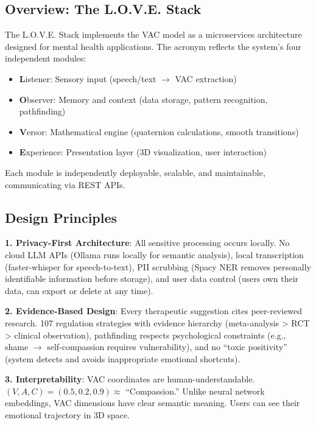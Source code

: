 \documentclass[10pt,twocolumn]{article}
\begin{document}
\subsection{Overview: The L.O.V.E. Stack}

The L.O.V.E. Stack implements the VAC model as a microservices architecture designed for mental health applications. The acronym reflects the system's four independent modules:

\begin{itemize}
    \item \textbf{L}istener: Sensory input (speech/text $\rightarrow$ VAC extraction)
    \item \textbf{O}bserver: Memory and context (data storage, pattern recognition, pathfinding)
    \item \textbf{V}ersor: Mathematical engine (quaternion calculations, smooth transitions)
    \item \textbf{E}xperience: Presentation layer (3D visualization, user interaction)
\end{itemize}

Each module is independently deployable, scalable, and maintainable, communicating via REST APIs.

\subsection{Design Principles}

\textbf{1. Privacy-First Architecture}: All sensitive processing occurs locally. No cloud LLM APIs (Ollama runs locally for semantic analysis), local transcription (faster-whisper for speech-to-text), PII scrubbing (Spacy NER removes personally identifiable information before storage), and user data control (users own their data, can export or delete at any time).

\textbf{2. Evidence-Based Design}: Every therapeutic suggestion cites peer-reviewed research. 107 regulation strategies with evidence hierarchy (meta-analysis > RCT > clinical observation), pathfinding respects psychological constraints (e.g., shame $\rightarrow$ self-compassion requires vulnerability), and no ``toxic positivity'' (system detects and avoids inappropriate emotional shortcuts).

\textbf{3. Interpretability}: VAC coordinates are human-understandable. $(V, A, C) = (0.5, 0.2, 0.9) \approx$ ``Compassion.'' Unlike neural network embeddings, VAC dimensions have clear semantic meaning. Users can see their emotional trajectory in 3D space.
\end{document}
